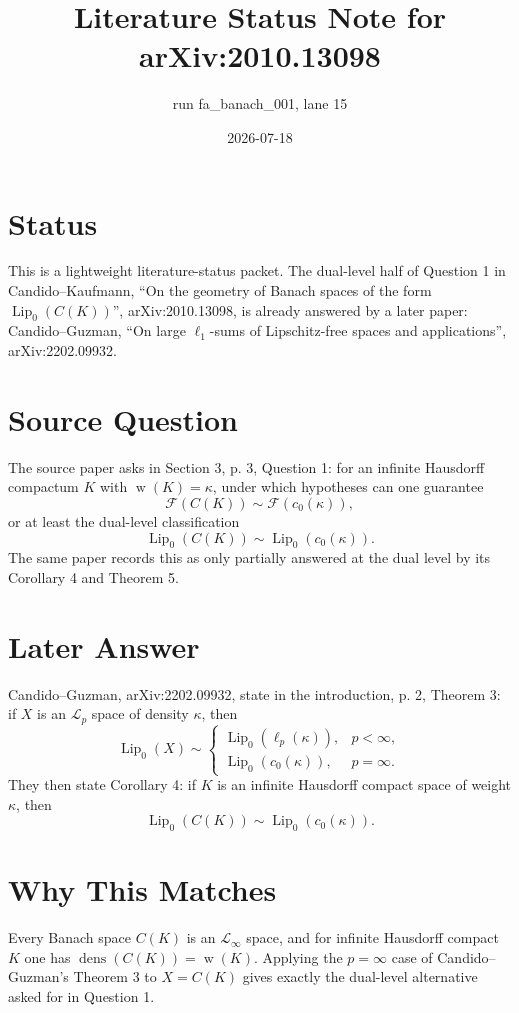 \documentclass[11pt]{article}
\title{Literature Status Note for arXiv:2010.13098}
\author{run fa\_banach\_001, lane 15}
\date{2026-07-18}
\newcommand{\Lip}{\operatorname{Lip}_0}
\newcommand{\F}{\mathcal{F}}
\newcommand{\dens}{\operatorname{dens}}
\newcommand{\w}{\operatorname{w}}
\begin{document}
\maketitle

\section*{Status}

This is a lightweight literature-status packet.  The dual-level half of
Question 1 in Candido--Kaufmann, ``On the geometry of Banach spaces of the form
$\Lip(C(K))$'', arXiv:2010.13098, is already answered by a later paper:
Candido--Guzman, ``On large $\ell_1$-sums of Lipschitz-free spaces and
applications'', arXiv:2202.09932.

\section*{Source Question}

The source paper asks in Section 3, p. 3, Question 1: for an infinite
Hausdorff compactum $K$ with $\w(K)=\kappa$, under which hypotheses can one
guarantee
\[
  \F(C(K)) \sim \F(c_0(\kappa)),
\]
or at least the dual-level classification
\[
  \Lip(C(K)) \sim \Lip(c_0(\kappa)).
\]
The same paper records this as only partially answered at the dual level by
its Corollary 4 and Theorem 5.

\section*{Later Answer}

Candido--Guzman, arXiv:2202.09932, state in the introduction, p. 2,
Theorem 3:
if $X$ is an $\mathcal L_p$ space of density $\kappa$, then
\[
  \Lip(X) \sim
  \begin{cases}
    \Lip(\ell_p(\kappa)), & p<\infty,\\
    \Lip(c_0(\kappa)), & p=\infty.
  \end{cases}
\]
They then state Corollary 4:
if $K$ is an infinite Hausdorff compact space of weight $\kappa$, then
\[
  \Lip(C(K)) \sim \Lip(c_0(\kappa)).
\]

\section*{Why This Matches}

Every Banach space $C(K)$ is an $\mathcal L_\infty$ space, and for infinite
Hausdorff compact $K$ one has $\dens(C(K))=\w(K)$. Applying the $p=\infty$
case of Candido--Guzman's Theorem 3 to $X=C(K)$ gives exactly the
dual-level alternative asked for in Question 1.
\end{document}
